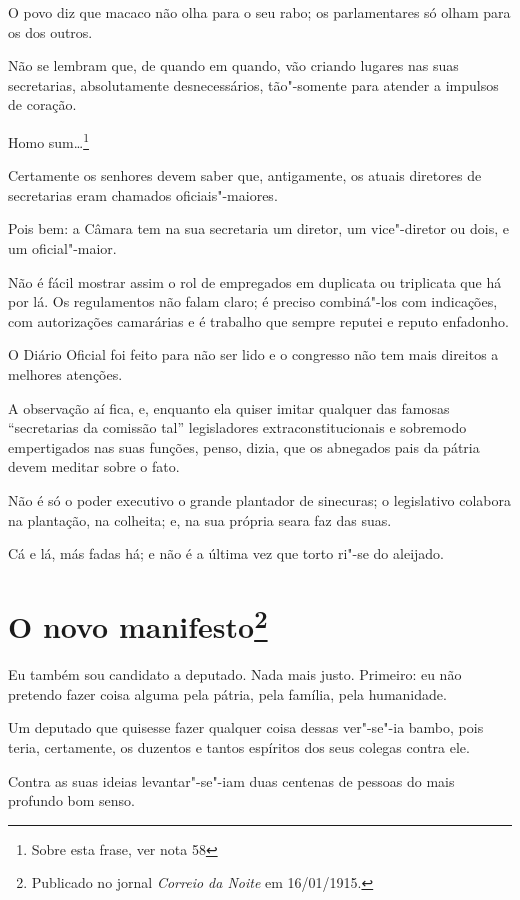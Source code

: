 O povo diz que macaco não olha para o seu rabo; os parlamentares só
olham para os dos outros.

Não se lembram que, de quando em quando, vão criando lugares nas suas
secretarias, absolutamente desnecessários, tão"-somente para atender a
impulsos de coração.

Homo sum\ldots{}\footnote{Sobre esta frase, ver nota 58}

Certamente os senhores devem saber que, antigamente, os atuais diretores
de secretarias eram chamados oficiais"-maiores.

Pois bem: a Câmara tem na sua secretaria um diretor, um vice"-diretor ou
dois, e um oficial"-maior.

Não é fácil mostrar assim o rol de empregados em duplicata ou triplicata
que há por lá. Os regulamentos não falam claro; é preciso combiná"-los
com indicações, com autorizações camarárias e é trabalho que sempre
reputei e reputo enfadonho.

O Diário Oficial foi feito para não ser lido e o congresso não tem mais
direitos a melhores atenções.

A observação aí fica, e, enquanto ela quiser imitar qualquer das famosas
``secretarias da comissão tal'' legisladores extraconstitucionais e
sobremodo empertigados nas suas funções, penso, dizia, que os abnegados
pais da pátria devem meditar sobre o fato.

Não é só o poder executivo o grande plantador de sinecuras; o
legislativo colabora na plantação, na colheita; e, na sua própria seara
faz das suas.

Cá e lá, más fadas há; e não é a última vez que torto ri"-se do aleijado.



\chapter[O novo manifesto]{O novo manifesto\footnote[*]{Publicado no jornal \emph{Correio da Noite} em 16/01/1915.}}

Eu também sou candidato a deputado. Nada mais justo. Primeiro: eu não
pretendo fazer coisa alguma pela pátria, pela família, pela humanidade.

Um deputado que quisesse fazer qualquer coisa dessas ver"-se"-ia bambo,
pois teria, certamente, os duzentos e tantos espíritos dos seus colegas
contra ele.

Contra as suas ideias levantar"-se"-iam duas centenas de pessoas do mais
profundo bom senso.

